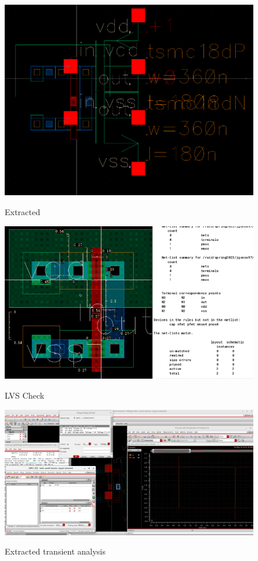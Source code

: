\documentclass{article}
\begin{document}
\begin{figure}[h]
	\includegraphics[width =\textwidth]{extracted.png}
	\label{extracted}
	\caption{Extracted}
\end{figure}

\begin{figure}[h]
	\includegraphics[width =\textwidth]{extractedLVS.png}
	\label{lvs}
	\caption{LVS Check}
\end{figure}


\begin{figure}[h]
	\includegraphics[width =\textwidth]{extractedtranstim.png}
	\label{extractedtrans}
	\caption{Extracted transient analysis}
\end{figure}
\end{document}
